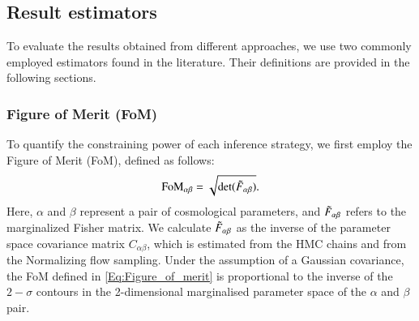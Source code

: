 \documentclass{aa}
\begin{document}
\subsection{Result estimators}
To evaluate the results obtained from different approaches, we use two commonly employed estimators found in the literature. Their definitions are provided in the following sections.
\subsubsection{Figure of Merit (FoM)}
To quantify the constraining power of each inference strategy, we first employ the Figure of Merit (FoM), defined as follows:
\begin{equation}\label{Eq:Figure_of_merit}
    \text{FoM}_{\alpha \beta}=\sqrt{\text{det}(\Tilde{F}_{\alpha \beta})}.
\end{equation}
Here, $\alpha$ and $\beta$ represent a pair of cosmological parameters, and $\Tilde{F}_{\alpha \beta}$ refers to the marginalized Fisher matrix. We calculate $\Tilde{F}_{\alpha \beta}$ as the inverse of the parameter space covariance matrix $C_{\alpha \beta}$, which is estimated from the HMC chains and from the Normalizing flow sampling. 
Under the assumption of a Gaussian covariance, the FoM defined in \autoref{Eq:Figure_of_merit} is proportional to the inverse of the $2-\sigma$ contours in the 2-dimensional marginalised parameter space of the $\alpha$ and $\beta$ pair.
\end{document}
